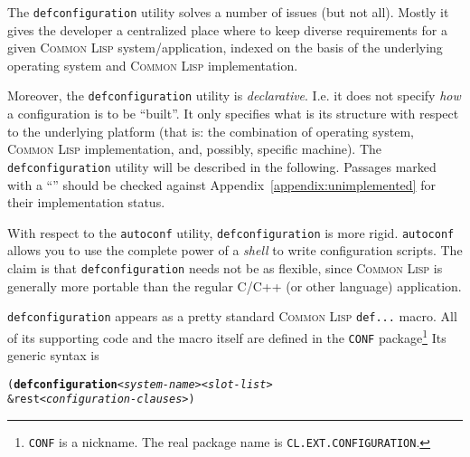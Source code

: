 \documentclass{article}
\newcommand{\CL}{\textsc{Common Lisp}}
\newcommand{\defconfiguration}{\texttt{defconfiguration}}
\newcommand{\notimpl}{\ddag}
\newcommand{\code}[1]{\texttt{#1}}
\begin{document}
 The \defconfiguration{} utility solves a number of issues (but not
all). Mostly it gives the developer a centralized place where to keep
diverse requirements for a given \CL{} system/application, indexed on
the basis of the underlying operating system and \CL{} implementation.

Moreover, the \defconfiguration{} utility is
\emph{declarative}. I.e. it does not specify \emph{how} a
configuration is to be ``built''. It only specifies what is its
structure with respect to the underlying platform (that is: the
combination of operating system, \CL{} implementation, and, possibly,
specific machine).  The \defconfiguration{} utility will be described
in the following. Passages marked with a ``\notimpl{}'' should be checked
against Appendix~\ref{appendix:unimplemented} for their implementation
status.

With respect to the \code{autoconf} utility, \defconfiguration{} is more
rigid.  \code{autoconf} allows you to use the complete power of a
\emph{shell} to write configuration scripts. The claim is that
\defconfiguration{} needs not be as flexible, since \CL{} is generally
more portable than the regular C/C++ (or other language) application.

\defconfiguration{} appears as a pretty standard \CL{} \code{def...}
macro. All of its supporting code and the macro itself are defined in
the \code{CONF} package\footnote{\code{CONF} is a nickname.  The real
package name is \code{CL.EXT.CONFIGURATION}.} Its generic syntax is

\begin{alltt}
(\textbf{defconfiguration} \emph{<system-name>} \emph{<slot-list>}
   &rest  \emph{<configuration-clauses>})
\end{alltt}
\end{document}
